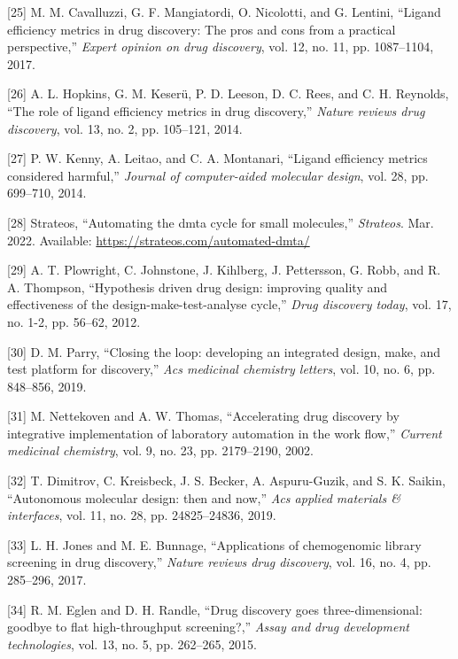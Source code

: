 \documentclass[11pt]{article}
\begin{document}
\hypertarget{citeproc_bib_item_25}{[25] M. M. Cavalluzzi, G. F. Mangiatordi, O. Nicolotti, and G. Lentini, “Ligand efficiency metrics in drug discovery: The pros and cons from a practical perspective,” \textit{Expert opinion on drug discovery}, vol. 12, no. 11, pp. 1087–1104, 2017.}

\hypertarget{citeproc_bib_item_26}{[26] A. L. Hopkins, G. M. Keserü, P. D. Leeson, D. C. Rees, and C. H. Reynolds, “The role of ligand efficiency metrics in drug discovery,” \textit{Nature reviews drug discovery}, vol. 13, no. 2, pp. 105–121, 2014.}

\hypertarget{citeproc_bib_item_27}{[27] P. W. Kenny, A. Leitao, and C. A. Montanari, “Ligand efficiency metrics considered harmful,” \textit{Journal of computer-aided molecular design}, vol. 28, pp. 699–710, 2014.}

\hypertarget{citeproc_bib_item_28}{[28] Strateos, “Automating the dmta cycle for small molecules,” \textit{Strateos}. Mar. 2022. Available: \url{https://strateos.com/automated-dmta/}}

\hypertarget{citeproc_bib_item_29}{[29] A. T. Plowright, C. Johnstone, J. Kihlberg, J. Pettersson, G. Robb, and R. A. Thompson, “Hypothesis driven drug design: improving quality and effectiveness of the design-make-test-analyse cycle,” \textit{Drug discovery today}, vol. 17, no. 1-2, pp. 56–62, 2012.}

\hypertarget{citeproc_bib_item_30}{[30] D. M. Parry, “Closing the loop: developing an integrated design, make, and test platform for discovery,” \textit{Acs medicinal chemistry letters}, vol. 10, no. 6, pp. 848–856, 2019.}

\hypertarget{citeproc_bib_item_31}{[31] M. Nettekoven and A. W. Thomas, “Accelerating drug discovery by integrative implementation of laboratory automation in the work flow,” \textit{Current medicinal chemistry}, vol. 9, no. 23, pp. 2179–2190, 2002.}

\hypertarget{citeproc_bib_item_32}{[32] T. Dimitrov, C. Kreisbeck, J. S. Becker, A. Aspuru-Guzik, and S. K. Saikin, “Autonomous molecular design: then and now,” \textit{Acs applied materials \& interfaces}, vol. 11, no. 28, pp. 24825–24836, 2019.}

\hypertarget{citeproc_bib_item_33}{[33] L. H. Jones and M. E. Bunnage, “Applications of chemogenomic library screening in drug discovery,” \textit{Nature reviews drug discovery}, vol. 16, no. 4, pp. 285–296, 2017.}

\hypertarget{citeproc_bib_item_34}{[34] R. M. Eglen and D. H. Randle, “Drug discovery goes three-dimensional: goodbye to flat high-throughput screening?,” \textit{Assay and drug development technologies}, vol. 13, no. 5, pp. 262–265, 2015.}
\end{document}
